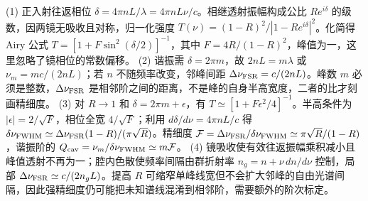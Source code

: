 (1) 正入射往返相位 \(\delta=4\pi nL/\lambda=4\pi nL\nu/c\)。相继透射振幅构成公比 \(Re^{i\delta}\) 的级数，因两镜无吸收且对称，归一化强度 \(T(\nu)=(1-R)^2/|1-Re^{i\delta}|^2\)。化简得 Airy 公式 \(T=[1+F\sin^2(\delta/2)]^{-1}\)，其中 \(F=4R/(1-R)^2\)，峰值为一，这里忽略了镜相位的常数偏移。
(2) 谐振需 \(\delta=2\pi m\)，故 \(2nL=m\lambda\) 或 \(\nu_m=mc/(2nL)\)；若 \(n\) 不随频率改变，邻峰间距 \(\Delta\nu_{\rm FSR}=c/(2nL)\)。峰数 \(m\) 必须是整数，\(\Delta\nu_{\rm FSR}\) 是相邻阶之间的距离，不是峰的自身半高宽度，二者的比才刻画精细度。
(3) 对 \(R\to1\) 和 \(\delta=2\pi m+\epsilon\)，有 \(T\simeq[1+F\epsilon^2/4]^{-1}\)。半高条件为 \(|\epsilon|=2/\sqrt F\)，相位全宽 \(4/\sqrt F\)；利用 \(d\delta/d\nu=4\pi nL/c\) 得 \(\delta\nu_{\rm FWHM}\simeq\Delta\nu_{\rm FSR}(1-R)/(\pi\sqrt R)\)。精细度 \(\mathcal F=\Delta\nu_{\rm FSR}/\delta\nu_{\rm FWHM}\simeq\pi\sqrt R/(1-R)\)，谐振阶的 \(Q_{\rm cav}=\nu_m/\delta\nu_{\rm FWHM}\simeq m\mathcal F\)。
(4) 镜吸收使有效往返振幅乘积减小且峰值透射不再为一；腔内色散使频率间隔由群折射率 \(n_g=n+\nu\,dn/d\nu\) 控制，局部 \(\Delta\nu_{\rm FSR}\simeq c/(2n_gL)\)。提高 \(R\) 可缩窄单峰线宽但不会扩大邻峰的自由光谱间隔，因此强精细度仍可能把未知谱线混淆到相邻阶，需要额外的阶次标定。
